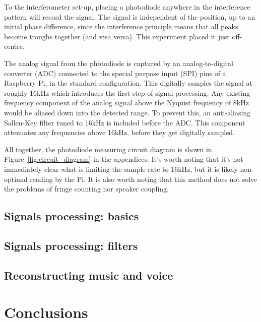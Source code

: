 \documentclass[prb,preprint]{revtex4-1}
\begin{document}
To the interferometer set-up, placing a photodiode anywhere in the interference pattern will record the signal. The signal is independent of the position, up to an initial phase difference, since the interference principle means that all peaks become troughs together (and visa versa). This experiment placed it just off-centre.


The analog signal from the photodiode is captured by an analog-to-digital converter (ADC) connected to the special purpose input (SPI) pins of a Raspberry Pi, in the standard configuration. This digitally samples the signal at roughly 16kHz which introduces the first step of signal processing. Any existing frequency component of the analog signal above the Nyquist frequency of 8kHz would be aliased down into the detected range. To prevent this, an anti-aliasing Sallen-Key filter tuned to 16kHz is included before the ADC. This component attenuates any frequencies above 16kHz, before they get digitally sampled.


All together, the photodiode measuring circuit diagram is shown in Figure~\ref{fig:circuit_diagram} in the appendices. It’s worth noting that it’s not immediately clear what is limiting the sample rate to 16kHz, but it is likely non-optimal reading by the Pi.
It is also worth noting that this method does not solve the problems of fringe counting nor speaker coupling.


\subsection{Signals processing: basics}

\subsection{Signals processing: filters}


\subsection{Reconstructing music and voice}


\section{Conclusions}
\end{document}
